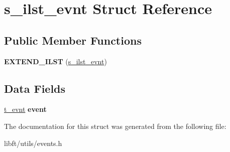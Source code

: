 \hypertarget{structs__ilst__evnt}{}\section{s\+\_\+ilst\+\_\+evnt Struct Reference}
\label{structs__ilst__evnt}
\subsection*{Public Member Functions}
\begin{DoxyCompactItemize}
\item 
\hypertarget{structs__ilst__evnt_a448109fc4d2ea2006b28a2f09911fffc}{}{\bfseries E\+X\+T\+E\+N\+D\+\_\+\+I\+L\+S\+T} (\hyperlink{structs__ilst__evnt}{s\+\_\+ilst\+\_\+evnt})\label{structs__ilst__evnt_a448109fc4d2ea2006b28a2f09911fffc}

\end{DoxyCompactItemize}
\subsection*{Data Fields}
\begin{DoxyCompactItemize}
\item 
\hypertarget{structs__ilst__evnt_a7ad64feb78d4f24df38c36ba3aecadb3}{}\hyperlink{structs__evnt}{t\+\_\+evnt} {\bfseries event}\label{structs__ilst__evnt_a7ad64feb78d4f24df38c36ba3aecadb3}

\end{DoxyCompactItemize}


The documentation for this struct was generated from the following file\+:\begin{DoxyCompactItemize}
\item 
libft/utils/events.\+h\end{DoxyCompactItemize}
